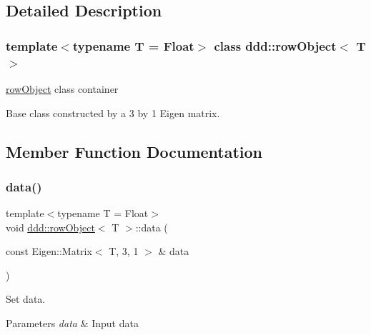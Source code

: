 \subsection{Detailed Description}
\subsubsection*{template$<$typename T = Float$>$\newline
class ddd\+::row\+Object$<$ T $>$}

\hyperlink{classddd_1_1row_object}{row\+Object} class container 

Base class constructed by a 3 by 1 Eigen matrix. 

\subsection{Member Function Documentation}
\mbox{\label{classddd_1_1row_object_ae90cbcdfbe32788d18f051a78f8188a6}} 
\subsubsection{\texorpdfstring{data()}{data()}}
{\footnotesize\ttfamily template$<$typename T  = Float$>$ \\
void \hyperlink{classddd_1_1row_object}{ddd\+::row\+Object}$<$ T $>$\+::data (\begin{DoxyParamCaption}\item[{const Eigen\+::\+Matrix$<$ T, 3, 1 $>$ \&}]{data }\end{DoxyParamCaption})\hspace{0.3cm}{\ttfamily [inline]}}



Set data. 


\begin{DoxyParams}{Parameters}
{\em data} & Input data \\
\hline
\end{DoxyParams}
\mbox{\label{classddd_1_1row_object_aff4fdb32f8b837e224b26de2bcecc7d2}} 

